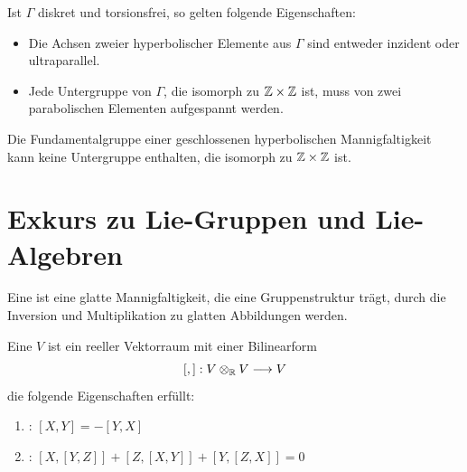 \documentclass{book}
\begin{document}
\Kor{}
Ist $\Gamma$ diskret und torsionsfrei, so gelten folgende Eigenschaften:
\begin{itemize}
	\item Die Achsen zweier hyperbolischer Elemente aus $\Gamma$ sind entweder inzident oder ultraparallel.
	\item Jede Untergruppe von $\Gamma$, die isomorph zu $\mathbb{Z}\times \mathbb{Z}$ ist, muss von zwei parabolischen Elementen aufgespannt werden.
\end{itemize}

\Kor{}
Die Fundamentalgruppe einer geschlossenen hyperbolischen Mannigfaltigkeit kann keine Untergruppe enthalten, die isomorph zu $\mathbb{Z}\times \mathbb{Z}$ ist.

\section{Exkurs zu Lie-Gruppen und Lie-Algebren}

\Def{}
Eine  ist eine glatte Mannigfaltigkeit, die eine Gruppenstruktur trägt, durch die Inversion und Multiplikation zu glatten Abbildungen werden.

\Def{}
Eine  $V$ ist ein reeller Vektorraum mit einer Bilinearform
\[ [,] : V\otimes_{\mathbb{R}} V \overset{}{\longrightarrow} V \]
die folgende Eigenschaften erfüllt:
\begin{enumerate}[1.)]
	\item {}: $[X,Y] = -[Y,X]$
	\item {}: $[X,[Y,Z]] + [Z,[X,Y]] + [Y,[Z,X]] = 0$
\end{enumerate}
\end{document}
